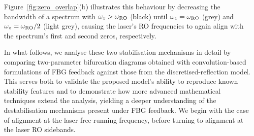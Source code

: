 Figure~\ref{fig:zero_overlap}(b) illustrates this behaviour by decreasing the bandwidth of a spectrum with $\omega_z>\omega_\text{RO}$ (black) until $\omega_z = \omega_\text{RO}$ (grey) and $\omega_z = \omega_\text{RO} / 2$ (light grey), causing the laser's RO frequencies to again align with the spectrum's first and second zeros, respectively.
%
\par
%
In what follows, we analyse these two stabilisation mechanisms in detail by comparing two-parameter bifurcation diagrams obtained with convolution-based formulations of FBG feedback \cite{li2015chaotic,skenderas2024impact} against those from the discretised-reflection model. 
This serves both to validate the proposed model’s ability to reproduce known stability features and to demonstrate how more advanced mathematical techniques extend the analysis, yielding a deeper understanding of the destabilisation mechanisms present under FBG feedback. 
We begin with the case of alignment at the laser free-running frequency, before turning to alignment at the laser RO sidebands.
%
%
